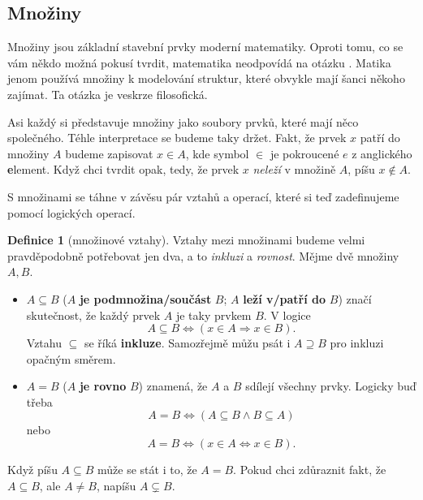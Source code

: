 \documentclass[a4paper,11pt]{article}
\theoremstyle{definition}
\newtheorem{dfn}[thm]{Definice}
\begin{document}
\subsection{Množiny}
\label{ssec:mnoziny}

Množiny jsou základní stavební prvky moderní matematiky. Oproti tomu, co se vám
někdo možná pokusí tvrdit, matematika neodpovídá na otázku .
Matika jenom používá množiny k modelování struktur, které obvykle mají šanci
někoho zajímat. Ta otázka je veskrze filosofická.

Asi každý si představuje množiny jako soubory prvků, které mají něco společného.
Téhle interpretace se budeme taky držet. Fakt, že prvek $x$ patří do množiny $A$
budeme zapisovat $x \in A$, kde symbol $ \in $ je pokroucené $e$ z anglického
\textbf{e}lement. Když chci tvrdit opak, tedy, že prvek $x$ \emph{neleží} v
množině $A$, píšu $x \notin A$.

S množinami se táhne v závěsu pár vztahů a operací, které si teď zadefinujeme
pomocí logických operací.

\begin{dfn}[množinové vztahy]
 Vztahy mezi množinami budeme velmi pravděpodobně potřebovat jen dva, a to
 \emph{inkluzi} a \emph{rovnost}. Mějme dvě množiny $A,B$.
 \begin{itemize}
  \item $A \subseteq B$ ($A$ \textbf{je podmnožina/součást} $B$; $A$ 
   \textbf{leží v/patří do} $B$) značí skutečnost, že každý prvek $A$ je taky
   prvkem $B$. V logice
   \[
    A \subseteq B \Leftrightarrow (x \in A \Rightarrow x \in B).
   \]
   Vztahu $ \subseteq $ se říká \textbf{inkluze}. Samozřejmě můžu psát i $A
   \supseteq B$ pro inkluzi opačným směrem.
  \item $A = B$ ($A$ \textbf{je rovno} $B$) znamená, že $A$ a $B$ sdílejí
   všechny prvky. Logicky buď třeba
   \[
    A = B \Leftrightarrow (A \subseteq B \wedge B \subseteq A)
   \]
   nebo
   \[
    A = B \Leftrightarrow (x \in A \Leftrightarrow x \in B).
   \]
 \end{itemize}
 Když píšu $A \subseteq B$ může se stát i to, že $A = B$. Pokud chci zdůraznit
 fakt, že $A \subseteq B$, ale $A \neq B$, napíšu $A \subsetneq B$.
\end{dfn}
\end{document}
